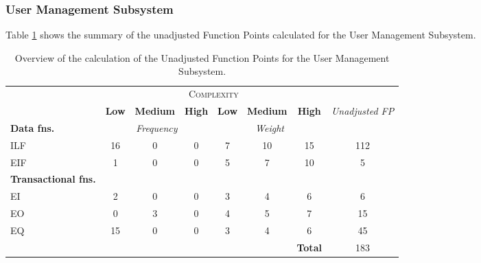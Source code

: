 \subsubsection{User Management Subsystem} 
Table \ref{tbl_UMS_UFP} shows the summary of the unadjusted Function Points calculated for the User Management Subsystem.
\begin{table}[hbtp]
\centering
\begin{tabular}{|l|c|c|c|c|c|c|c|}
\cline{2-7}
\multicolumn{1}{c}{} & \multicolumn{6}{|c|}{\textsc{Complexity}} & \multicolumn{1}{c}{}  \\ \cline{2-8}
\multicolumn{1}{c|}{} & \textbf{Low} & \textbf{Medium} & \textbf{High} & \textbf{Low} & \textbf{Medium} & \textbf{High} & \multirow{2}{*}{\textit{Unadjusted FP}} \\ \cline{1-7}
\textbf{Data fns.} & \multicolumn{3}{|c|}{\textit{Frequency}} &  \multicolumn{3}{|c|}{\textit{Weight}} & \\ \hline
ILF 	& 16 & 0 & 0 & 7 & 10 & 15 & 112 	\\ \hline
EIF 	& 1  & 0 & 0 & 5 & 7  & 10 & 5		\\ \hline
\textbf{Transactional fns.} & \multicolumn{7}{|c|}{} \\ \hline
EI 		& 2  & 0 & 0 & 3 & 4  & 6  & 6 		\\ \hline
EO 		& 0  & 3 & 0 & 4 & 5  & 7  & 15		\\ \hline
EQ		& 15 & 0 & 0 & 3 & 4  & 6  & 45		\\ \hline
\multicolumn{6}{c|}{} & \textbf{Total} & 183 \\ \cline{7-8}
\end{tabular}
\caption{Overview of the calculation of the Unadjusted Function Points for the User Management Subsystem.}
\label{tbl_UMS_UFP}
\end{table}


